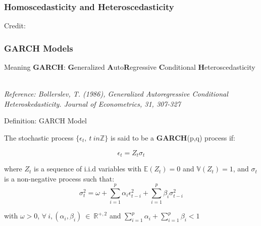 \documentclass{beamer}
\begin{document}
\begin{frame}
  \frametitle{Homoscedasticity and Heteroscedasticity}
  \hspace*{15pt}\hbox{\scriptsize Credit:}          
\end{frame}

\begin{frame}
  \frametitle{GARCH Models}

  \begin{alertblock}{Meaning}
    \textbf{GARCH}: \textbf{G}eneralized \textbf{A}uto\textbf{R}egressive \textbf{C}onditional \textbf{H}eteroscedasticity    \    
  \end{alertblock}

\medskip
  
\emph{Reference: Bollerslev, T. (1986), Generalized Autoregressive Conditional Heteroskedasticity. Journal of
  Econometrics, 31, 307-327}\\

\end{frame}


\begin{frame}
\begin{block}{Definition: GARCH Model}

  The stochastic process $\{ \epsilon_t, \ t \ in \mathbb{Z} \}$ is said to be a \textbf{GARCH}(p,q) process if:

  \begin{equation*}
    \epsilon_t = Z_t \sigma_t
  \end{equation*}

  \medskip

  where $Z_t$ is a sequence of i.i.d variables with $\mathbb{E}(Z_t) = 0$ and $\mathbb{V}(Z_t) = 1$, and $\sigma_t$ is a non-negative process such that:
  \begin{equation*}
    \sigma^2_t = \omega + \sum^p_{i=1} \alpha_i \epsilon^2_{t-i} + \sum^p_{i=1} \beta_i \sigma^2_{t-i}
  \end{equation*}

  \medskip

  with $\omega >0$, $\forall \ i, (\alpha_i, \beta_i) \ \in \ \mathbb{R}^{+,2}$ and $\sum^p_{i=1} \alpha_i + \sum^p_{i=1} \beta_i <1$  
\end{block}
\end{frame}
\end{document}
